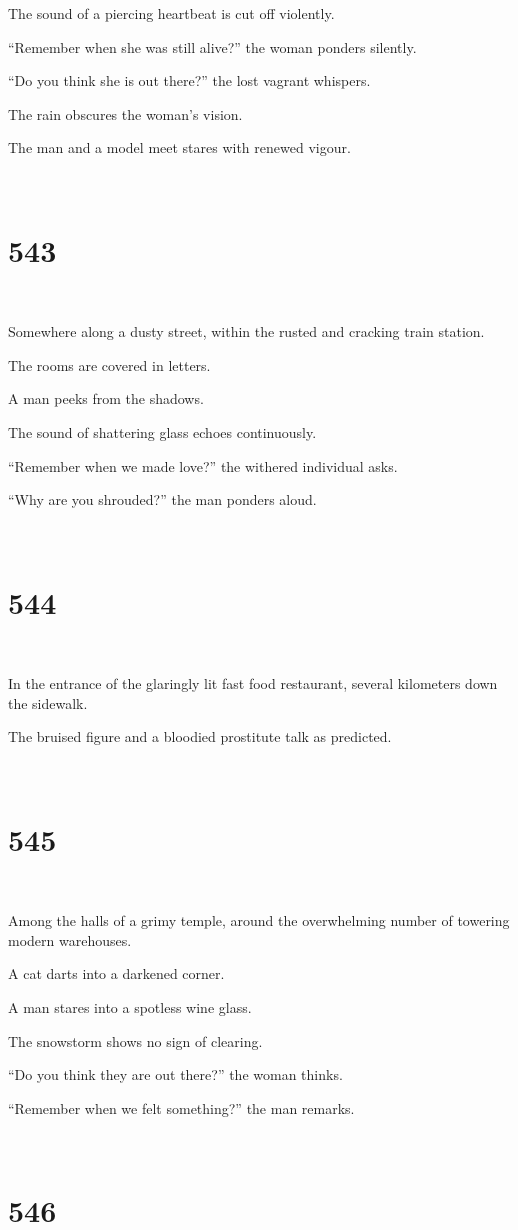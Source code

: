 \documentclass{report}
\begin{document}
The sound of a piercing heartbeat is cut off violently.

``Remember when she was still alive?'' the woman ponders silently.

``Do you think she is out there?'' the lost vagrant whispers.

The rain obscures the woman's vision.

The man and a model meet stares with renewed vigour.

~
\chapter*{543}
~

Somewhere along a dusty street, within the rusted and cracking train station.

The rooms are covered in letters.

A man peeks from the shadows.

The sound of shattering glass echoes continuously.

``Remember when we made love?'' the withered individual asks.

``Why are you shrouded?'' the man ponders aloud.

~
\chapter*{544}
~

In the entrance of the glaringly lit fast food restaurant, several kilometers down the sidewalk.

The bruised figure and a bloodied prostitute talk as predicted.

~
\chapter*{545}
~

Among the halls of a grimy temple, around the overwhelming number of towering modern warehouses.

A cat darts into a darkened corner.

A man stares into a spotless wine glass.

The snowstorm shows no sign of clearing.

``Do you think they are out there?'' the woman thinks.

``Remember when we felt something?'' the man remarks.

~
\chapter*{546}
~
\end{document}
